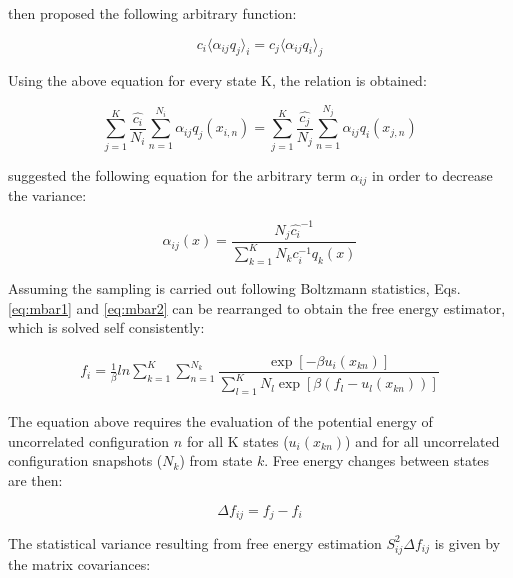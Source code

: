 	 then proposed the following arbitrary function:
	
	\begin{equation}
	c_{i} \langle \alpha _{ij} q_{j} \rangle _{i}  =  c_{j} \langle \alpha _{ij} q_{i} \rangle _{j} 
	\end{equation}
	
	Using the above equation for every state  K, the relation is obtained:
	
	\begin{equation}
	\label{eq:mbar1}
	\sum_{j=1}^{K} \frac{\hat{c_{i}}}{N_{i}} \sum_{n=1}^{N_{i}} \alpha _{ij} q_{j} (x_{i,n}) =  \sum_{j=1}^{K} \frac{\hat{c_{j}}}{N_{j}} \sum_{n=1}^{N_{j}} \alpha _{ij} q_{i} (x_{j,n})
	\end{equation}
	
	 suggested the following equation for the arbitrary term $\alpha _{ij}$ in order to decrease the variance:
	
	\begin{equation}
	\label{eq:mbar2}
	\alpha _{ij} (x) = \frac{N_{j} \hat{c_{i}} ^{-1}}{\sum_{k=1}^{K} N_{k} c_{i} ^{-1} q_{k}(x)}
	\end{equation}
	
	Assuming the sampling is carried out following Boltzmann statistics, Eqs. \eqref{eq:mbar1} and \eqref{eq:mbar2} can be rearranged to obtain the free energy estimator, which is solved self consistently:  
	
	\begin{equation}
	\label{eq:mbar}
	\begin{aligned}
	f_{i} = \frac{1}{\beta}ln \sum_{k=1}^{K} \sum_{n=1}^{N_{k}}
	\dfrac{\exp[-\beta u_{i}(x_{kn})]}{\sum_{l=1}^{K} N_{l} \exp[\beta (f_{l} - u_{l}(x_{kn}))]}
	\end{aligned}
	\end{equation}
	
	The equation above requires the evaluation of the potential energy  of uncorrelated configuration $n$ for all K states ($u_{i}(x_{kn})$) and for all uncorrelated configuration snapshots ($N_{k}$) from state $k$. Free energy changes between states are then:
	
	\begin{equation}
	\Delta f_{ij} = f_{j} -  f_{i} 
	\end{equation} 
	
	The statistical variance resulting from free energy estimation $S_{ij}^{2} \Delta f_{ij}$ is given by the matrix covariances:
	
